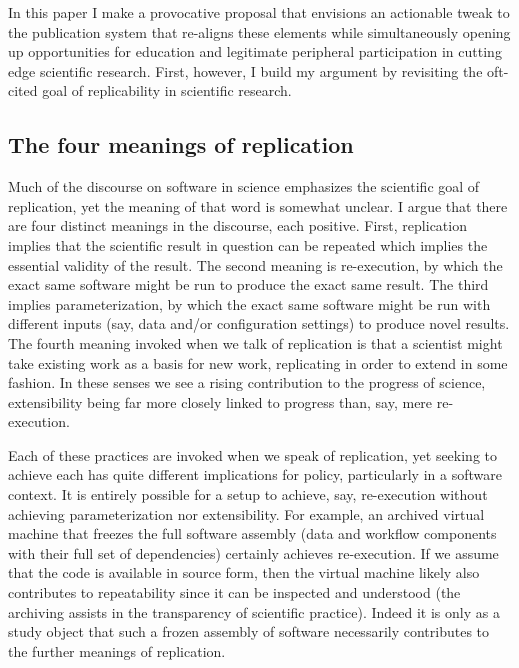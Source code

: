\documentclass{sigchi}
\begin{document}
In this paper I make a provocative proposal that envisions an actionable tweak to the publication system that re-aligns these elements while simultaneously opening up opportunities for education and legitimate peripheral participation in cutting edge scientific research.  First, however, I build my argument by revisiting the oft-cited goal of replicability in scientific research.

\subsection{The four meanings of replication}

Much of the discourse on software in science emphasizes the scientific goal of replication, yet the meaning of that word is somewhat unclear.  I argue that there are four distinct meanings in the discourse, each positive. First, replication implies that the scientific result in question can be repeated which implies the essential validity of the result. The second meaning is re-execution, by which the exact same software might be run to produce the exact same result. The third implies parameterization, by which the exact same software might be run with different inputs (say, data and/or configuration settings) to produce novel results. The fourth meaning invoked when we talk of replication is that a scientist might take existing work as a basis for new work, replicating in order to extend in some fashion. In these senses we see a rising contribution to the progress of science, extensibility being far more closely linked to progress than, say, mere re-execution.

Each of these practices are invoked when we speak of replication, yet seeking to achieve each has quite different implications for policy, particularly in a software context. It is entirely possible for a setup to achieve, say, re-execution without achieving parameterization nor extensibility. For example, an archived virtual machine that freezes the full software assembly (data and workflow components with their full set of dependencies) certainly achieves re-execution. If we assume that the code is available in source form, then the virtual machine likely also contributes to repeatability since it can be inspected and understood (the archiving assists in the transparency of scientific practice). Indeed it is only as a study object that such a frozen assembly of software necessarily contributes to the further meanings of replication.
\end{document}
